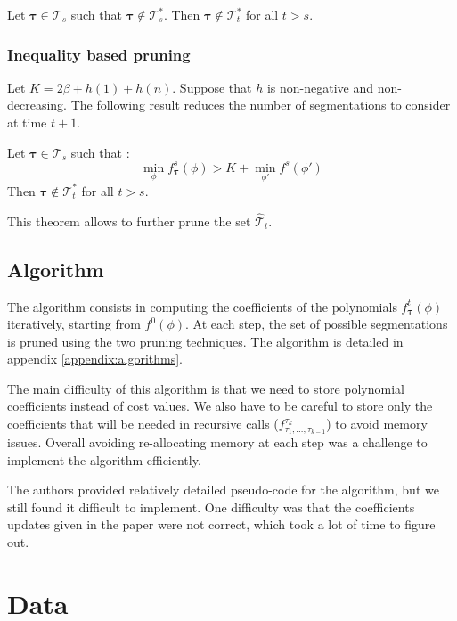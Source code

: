 \documentclass[11pt]{article}
\begin{document}
\begin{theorem}
    \label{th:functional_pruning}
    Let $\boldsymbol{\tau}\in\mathcal{T}_s$ such that $\boldsymbol{\tau}\notin \mathcal{T}_s^*$. Then $\boldsymbol{\tau}\notin \mathcal{T}_t^*$ for all $t>s$.
\end{theorem}

\subsubsection{Inequality based pruning} Let $K=2\beta+h(1)+h(n)$. Suppose that $h$ is non-negative and non-decreasing. The following result reduces the number of segmentations to consider at time $t+1$.

\begin{theorem}
    Let $\boldsymbol{\tau}\in\mathcal{T}_s$ such that :
    $$\min_\phi f_{\boldsymbol{\tau}}^s(\phi) > K + \min_{\phi'} f^s(\phi')$$
    Then $\boldsymbol{\tau}\notin \mathcal{T}_t^*$ for all $t>s$.
\end{theorem}

This theorem allows to further prune the set $\hat{\mathcal{T}}_t$.

\subsection{Algorithm}

The algorithm consists in computing the coefficients of the polynomials $f^t_{\boldsymbol{\tau}}(\phi)$ iteratively, starting from $f^0(\phi)$. At each step, the set of possible segmentations is pruned using the two pruning techniques. The algorithm is detailed in appendix \ref{appendix:algorithms}.

The main difficulty of this algorithm is that we need to store polynomial coefficients instead of cost values. We also have to be careful to store only the coefficients that will be needed in recursive calls ($f^{\tau_k}_{\tau_1,\dots,\tau_{k-1}}$) to avoid memory issues. Overall avoiding re-allocating memory at each step was a challenge to implement the algorithm efficiently.

The authors provided relatively detailed pseudo-code for the algorithm, but we still found it difficult to implement. One difficulty was that the coefficients updates given in the paper were not correct, which took a lot of time to figure out.

\section{Data}
\end{document}
